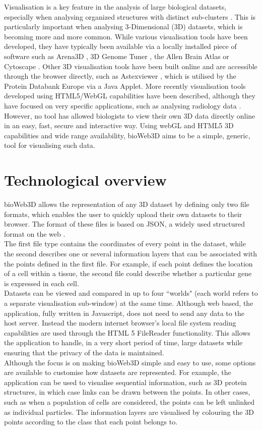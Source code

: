 \documentclass{bioinfo}
\begin{document}
Visualisation is a key feature in the analysis of large biological datasets, especially when analysing organized structures with distinct sub-clusters \citep{Rubel10}. This is particularly important when analysing 3-Dimensional (3D) datasets, which is becoming more and more common. While various visualisation tools have been developed, they have typically been available via a locally installed piece of software such as Arena3D \citep{Pavlopoulos08},  3D Genome Tuner \citep{Wang09}, the Allen Brain Atlas \citep{Lein07} or Cytoscape \citep{Shannon03}. Other 3D visualisation tools have been built online and are accessible through the browser directly, such as Astexviewer \citep{Hartshorn02}, which is utilised by the Protein Databank Europe via a Java Applet. More recently visualisation tools developed using HTML5/WebGL capabilities have been described, although they have focused on very specific applications, such as analysing radiology data  \citep{Dinesh12}. However, no tool has allowed biologists to view their own 3D data directly online in an easy, fast, secure and interactive way. Using webGL and HTML5 3D capabilities and wide range availability, bioWeb3D aims to be a simple, generic, tool for visualising such data.



\section{Technological overview}

bioWeb3D allows the representation of any 3D dataset by defining only two file formats, which enables the user to quickly upload their own datasets to their browser. The format of these files is based on JSON, a widely used structured format on the web \citep{Wilde07}.\\
The first file type contains the coordinates of every point in the dataset, while the second describes one or several information layers that can be associated with the points defined in the first file. For example, if each point defines the location of a cell within a tissue, the second file could describe whether a particular gene is expressed in each cell. \\
Datasets can be viewed and compared in up to four ``worlds" (each world refers to a separate visualisation sub-window) at the same time. Although web based, the application, fully written in Javascript, does not need to send any data to the host server. Instead the modern internet browser's local file system reading capabilities are used through the HTML 5 FileReader functionality. This allows the application to handle, in a very short period of time, large datasets while ensuring that the privacy of the data is maintained.\\
Although the focus is on making bioWeb3D simple and easy to use, some options are available to customise how datasets are represented. For example, the application can be used to visualise sequential information, such as 3D protein structures, in which case links can be drawn between the points. In other cases, such as when a population of cells are considered, the points can be left unlinked as individual particles. The information layers are visualised by colouring the 3D points according to the class that each point belongs to.
\end{document}
